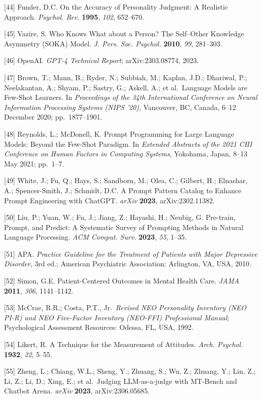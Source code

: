 \documentclass[apajournal,article,submit,moreauthors]{Definitions/mdpi}
\begin{document}
{[}44{]} Funder, D.C. On the Accuracy of Personality Judgment: A Realistic Approach. \emph{Psychol. Rev.} \textbf{1995}, \emph{102}, 652--670.

{[}45{]} Vazire, S. Who Knows What about a Person? The Self--Other Knowledge Asymmetry (SOKA) Model. \emph{J. Pers. Soc. Psychol.} \textbf{2010}, \emph{99}, 281--303.

{[}46{]} OpenAI. \emph{GPT-4 Technical Report}; arXiv:2303.08774, 2023.

{[}47{]} Brown, T.; Mann, B.; Ryder, N.; Subbiah, M.; Kaplan, J.D.; Dhariwal, P.; Neelakantan, A.; Shyam, P.; Sastry, G.; Askell, A.; et al.~Language Models are Few-Shot Learners. In \emph{Proceedings of the 34th International Conference on Neural Information Processing Systems (NIPS '20)}, Vancouver, BC, Canada, 6--12 December 2020; pp.~1877--1901.

{[}48{]} Reynolds, L.; McDonell, K. Prompt Programming for Large Language Models: Beyond the Few-Shot Paradigm. In \emph{Extended Abstracts of the 2021 CHI Conference on Human Factors in Computing Systems}, Yokohama, Japan, 8--13 May 2021; pp.~1--7.

{[}49{]} White, J.; Fu, Q.; Hays, S.; Sandborn, M.; Olea, C.; Gilbert, H.; Elnashar, A.; Spencer-Smith, J.; Schmidt, D.C. A Prompt Pattern Catalog to Enhance Prompt Engineering with ChatGPT. \emph{arXiv} \textbf{2023}, arXiv:2302.11382.

{[}50{]} Liu, P.; Yuan, W.; Fu, J.; Jiang, Z.; Hayashi, H.; Neubig, G. Pre-train, Prompt, and Predict: A Systematic Survey of Prompting Methods in Natural Language Processing. \emph{ACM Comput. Surv.} \textbf{2023}, \emph{55}, 1--35.

{[}51{]} APA. \emph{Practice Guideline for the Treatment of Patients with Major Depressive Disorder}, 3rd ed.; American Psychiatric Association: Arlington, VA, USA, 2010.

{[}52{]} Simon, G.E. Patient-Centered Outcomes in Mental Health Care. \emph{JAMA} \textbf{2011}, \emph{306}, 1141--1142.

{[}53{]} McCrae, R.R.; Costa, P.T., Jr.~\emph{Revised NEO Personality Inventory (NEO PI-R) and NEO Five-Factor Inventory (NEO-FFI) Professional Manual}; Psychological Assessment Resources: Odessa, FL, USA, 1992.

{[}54{]} Likert, R. A Technique for the Measurement of Attitudes. \emph{Arch. Psychol.} \textbf{1932}, \emph{22}, 5--55.

{[}55{]} Zheng, L.; Chiang, W.L.; Sheng, Y.; Zhuang, S.; Wu, Z.; Zhuang, Y.; Lin, Z.; Li, Z.; Li, D.; Xing, E.; et al.~Judging LLM-as-a-judge with MT-Bench and Chatbot Arena. \emph{arXiv} \textbf{2023}, arXiv:2306.05685.
\end{document}
